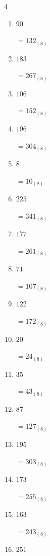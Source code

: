 \begin{multicols}{4}
\begin{enumerate}
        $=176_{(8)}$

  \item $90$

        $=132_{(8)}$

  \item $183$

        $=267_{(8)}$

  \item $106$

        $=152_{(8)}$

  \item $196$

        $=304_{(8)}$

  \item $8$

        $=10_{(8)}$

  \item $225$

        $=341_{(8)}$

  \item $177$

        $=261_{(8)}$

\columnbreak %

\resetques

  \item $71$

        $=107_{(8)}$

  \item $122$

        $=172_{(8)}$

  \item $20$

        $=24_{(8)}$

  \item $35$

        $=43_{(8)}$

  \item $87$

        $=127_{(8)}$

  \item $195$

        $=303_{(8)}$

  \item $173$

        $=255_{(8)}$

  \item $163$

        $=243_{(8)}$

  \item $251$


\end{enumerate}
\end{multicols}
